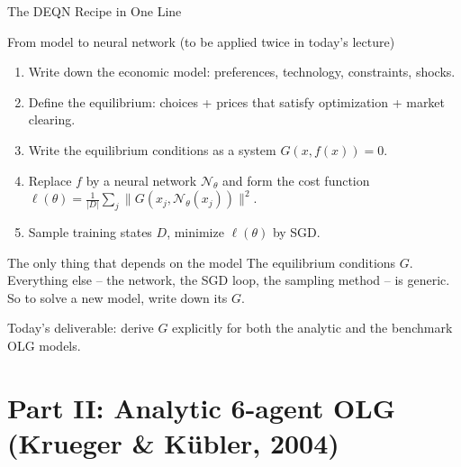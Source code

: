 \documentclass[aspectratio=169,11pt]{beamer}
\newcommand{\emphc}[1]{\textcolor{harvardcrimson}{#1}}
\newcommand{\N}{\mathcal{N}}
\newcommand{\Loss}{\ell}
\begin{document}
\begin{frame}{The DEQN Recipe in One Line}
\small
\begin{block}{From model to neural network (to be applied twice in today's lecture)}
\begin{enumerate}\itemsep2pt
    \item Write down the \emphc{economic model}: preferences, technology, constraints, shocks.
    \item Define the \emphc{equilibrium}: choices + prices that satisfy optimization + market clearing.
    \item Write the \emphc{equilibrium conditions} as a system $G(x, f(x)) = 0$.
    \item Replace $f$ by a \emphc{neural network} $\N_\theta$ and form the \emphc{cost function} $\Loss(\theta) = \frac{1}{|D|}\sum_j \|G(x_j, \N_\theta(x_j))\|^2$.
    \item Sample training states $D$, minimize $\Loss(\theta)$ by SGD.
\end{enumerate}
\end{block}

\begin{alertblock}{The only thing that depends on the model}
The \emphc{equilibrium conditions $G$}.  Everything else -- the network, the SGD loop, the sampling method -- is generic.  \emphc{So to solve a new model, write down its $G$.}
\end{alertblock}

\vspace{0.2em}
{\footnotesize Today's deliverable: derive $G$ explicitly for both the analytic and the benchmark OLG models.}
\end{frame}



\section{Part II: Analytic 6-agent OLG (Krueger \& K\"ubler, 2004)}
\end{document}
